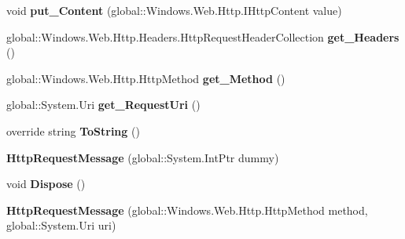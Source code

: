 \begin{DoxyCompactItemize}
void {\bfseries put\+\_\+\+Content} (global\+::\+Windows.\+Web.\+Http.\+I\+Http\+Content value)
\item 
\mbox{\label{class_windows_1_1_web_1_1_http_1_1_http_request_message_a7954249df0daf81ada6573d24a237db8}} 
global\+::\+Windows.\+Web.\+Http.\+Headers.\+Http\+Request\+Header\+Collection {\bfseries get\+\_\+\+Headers} ()
\item 
\mbox{\label{class_windows_1_1_web_1_1_http_1_1_http_request_message_a4e6485899f5654f598f0911225702f86}} 
global\+::\+Windows.\+Web.\+Http.\+Http\+Method {\bfseries get\+\_\+\+Method} ()
\item 
\mbox{\label{class_windows_1_1_web_1_1_http_1_1_http_request_message_a60eee69978be3f99e85a37b7bf05850d}} 
global\+::\+System.\+Uri {\bfseries get\+\_\+\+Request\+Uri} ()
\item 
\mbox{\label{class_windows_1_1_web_1_1_http_1_1_http_request_message_a311ec1966990d2a837636dfe734907f3}} 
override string {\bfseries To\+String} ()
\item 
\mbox{\label{class_windows_1_1_web_1_1_http_1_1_http_request_message_a266f73c079be0dd9c1b831b69dd1731e}} 
{\bfseries Http\+Request\+Message} (global\+::\+System.\+Int\+Ptr dummy)
\item 
\mbox{\label{class_windows_1_1_web_1_1_http_1_1_http_request_message_a45b7a3697d6f36e790546f21c5011670}} 
void {\bfseries Dispose} ()
\item 
\mbox{\label{class_windows_1_1_web_1_1_http_1_1_http_request_message_a59606adfc5f01047a058c7802520488d}} 
{\bfseries Http\+Request\+Message} (global\+::\+Windows.\+Web.\+Http.\+Http\+Method method, global\+::\+System.\+Uri uri)
\item 
\mbox{\label{class_windows_1_1_web_1_1_http_1_1_http_request_message_a2d95b5c161ea61544f6c82430b9bef3d}} 

\end{DoxyCompactItemize}
